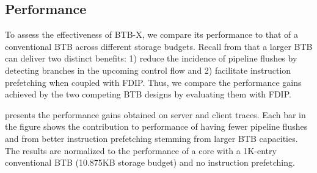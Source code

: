 \subsection{Performance}

To assess the effectiveness of BTB-X, we compare its performance to that of a conventional BTB across different storage budgets.  
Recall from  that a larger BTB can deliver two distinct benefits: 1) reduce the incidence of pipeline flushes by detecting branches in the upcoming control flow and 2) facilitate instruction prefetching when coupled with FDIP. Thus, we compare the performance gains achieved by the two competing BTB designs by evaluating them with FDIP. 

 presents the performance gains obtained on server and client traces. Each bar in the figure shows the contribution to performance of having fewer pipeline flushes and from better instruction prefetching stemming from larger BTB capacities. The results are normalized to the performance of a core with a 1K-entry conventional BTB (10.875KB storage budget) and no instruction prefetching. 

